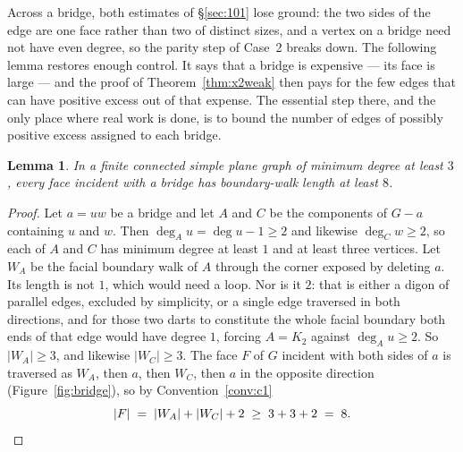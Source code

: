 \documentclass{baustms}
\theoremstyle{cupthm}
\newtheorem{lemma}[theorem]{Lemma}
\theoremstyle{cupdefn}
\theoremstyle{cuprem}
\begin{document}
Across a bridge, both estimates of \S\ref{sec:101} lose ground: the two sides of
the edge are one face rather than two of distinct sizes, and a vertex on a bridge
need not have even degree, so the parity step of Case~2 breaks down. The
following lemma restores enough control. It says that a bridge is expensive --- its face is large --- and the
proof of Theorem~\ref{thm:x2weak} then pays for the few edges that can have
positive excess out of that expense. The essential step there, and the only place
where real work is done, is to bound the number of edges of possibly positive
excess assigned to each bridge.

\begin{lemma}\label{lem:bridgeface}
In a finite connected simple plane graph of minimum degree at least $3$, every
face incident with a bridge has boundary-walk length at least $8$.
\end{lemma}

\begin{proof}
Let $a = uw$ be a bridge and let $A$ and $C$ be the components of $G-a$
containing $u$ and $w$. Then $\deg_A u = \deg u - 1 \ge 2$ and likewise
$\deg_C w \ge 2$, so each of $A$ and $C$ has minimum degree at least $1$ and at
least three vertices. Let $W_A$ be the facial boundary walk of $A$ through the
corner exposed by deleting $a$. Its length is not $1$, which would need a loop.
Nor is it $2$: that is either a digon of parallel edges, excluded by simplicity,
or a single edge traversed in both directions, and for those two darts to
constitute the whole facial boundary both ends of that edge would have degree
$1$, forcing $A = K_2$ against $\deg_A u \ge 2$. So $|W_A| \ge 3$, and likewise
$|W_C| \ge 3$. The face $F$ of $G$ incident with both sides of $a$ is traversed
as $W_A$, then $a$, then $W_C$, then $a$ in the opposite direction
(Figure~\ref{fig:bridge}), so by Convention~\ref{conv:c1}
\[
  |F| \;=\; |W_A| + |W_C| + 2 \;\ge\; 3 + 3 + 2 \;=\; 8 . \qedhere
\]
\end{proof}
\end{document}
